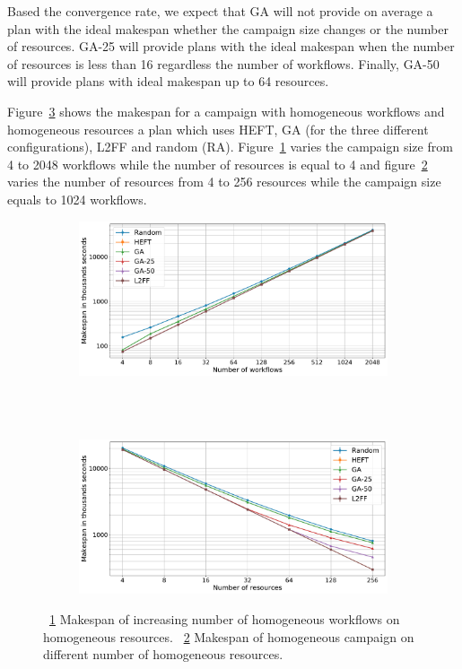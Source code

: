 Based the convergence rate, we expect that GA will not provide on average a plan with the ideal makespan whether the campaign size changes or the number of resources.
GA-25 will provide plans with the ideal makespan when the number of resources is less than 16 regardless the number of workflows.
Finally, GA-50 will provide plans with ideal makespan up to 64 resources.

Figure~\ref{fig:st_homog_analysis} shows the makespan for a campaign with homogeneous workflows and homogeneous resources a plan which uses HEFT, GA (for the three different configurations), L2FF and random (RA).
Figure~\ref{fig:StHomoCampaigns_4StHomoResources} varies the campaign size from 4 to 2048 workflows while the number of resources is equal to 4 and figure~\ref{fig:StHomoResources_StHomoCampaigns} varies the number of resources from 4 to 256 resources while the campaign size equals to 1024 workflows.

\begin{figure}[ht!]
    \centering
    \begin{subfigure}[b]{0.75\textwidth}
        \includegraphics[width=.95\textwidth]{figures/campaign/StHomoCampaigns_4StHomoResources.pdf}
        \caption{}
        \label{fig:StHomoCampaigns_4StHomoResources}
    \end{subfigure}\\
    ~ 
    \begin{subfigure}[b]{0.75\textwidth}
        \includegraphics[width=.95\textwidth]{figures/campaign/StHomoResources_StHomoCampaigns.pdf}
        \caption{}
        \label{fig:StHomoResources_StHomoCampaigns}
    \end{subfigure}
    \caption{~\ref{fig:StHomoCampaigns_4StHomoResources} Makespan of increasing number of homogeneous workflows on homogeneous resources.
    ~\ref{fig:StHomoResources_StHomoCampaigns} Makespan of homogeneous campaign on different number of homogeneous resources.}
    \label{fig:st_homog_analysis}
\end{figure}


